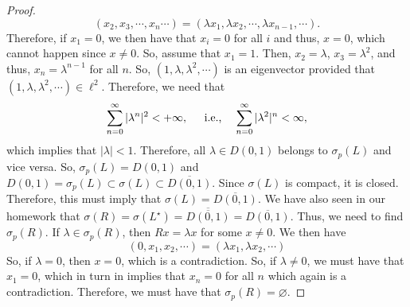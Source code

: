 \documentclass[oneside]{book}
\newcommand{\sumo}{\sum\limits_{n = 0}^{\infty}}
\newcommand{\ov}{\overline}
\newcommand{\sbs}{\subset}
\begin{document}
\begin{proof}
\[ (x_2, x_3, \cdots, x_n \cdots) = (\lambda x_1, \lambda x_2, \cdots, \lambda x_{n -1}, \cdots ).\]
Therefore, if $x_1 = 0$, we then have that $x_i = 0$ for all $i$ and thus, $x = 0$, which cannot happen since $x \neq 0$. So, assume that $x_1 = 1$. Then, $x_2 = \lambda$, $x_3= \lambda^2$, and thus, $x_n = \lambda^{n-1}$ for all $n$. So, $(1, \lambda, \lambda^2, \cdots)$ is an eigenvector provided that $(1, \lambda, \lambda^2, \cdots) \in \ell^2$. Therefore, we need that 
\[ \sumo |\lambda^n|^2 < + \infty, \hspace{4mm} \text{ i.e.,} \hspace{4mm} \sumo |\lambda^2|^n < \infty,\]
which implies that $|\lambda |< 1$. Therefore, all $\lambda \in D(0, 1)$ belongs to $\sigma_p(L)$ and vice versa. So, $\sigma_p(L) = D(0,1)$ and $D(0, 1) = \sigma_p(L) \sbs \sigma(L) \sbs \ov{D(0, 1)}$. Since $\sigma(L)$ is compact, it is closed. Therefore, this must imply that $\sigma(L) = \ov{D(0, 1)}$. We have also seen in our homework that $\sigma(R) = \sigma(L^{\star}) = \ov{\ov{D(0, 1)}} = \ov{D(0,1)}$. Thus, we need to find $\sigma_p(R)$. If $\lambda \in \sigma_p(R)$, then $Rx = \lambda x$ for some $x \neq 0$. We then have 
\[ (0, x_1, x_2, \cdots) = (\lambda x_1, \lambda x_2, \cdots)\]
So, if $\lambda = 0$, then $x = 0$, which is a contradiction. So, if $\lambda \neq 0$, we must have that $x_1 = 0$, which in turn in implies that $x_n = 0$ for all $n$ which again is a contradiction. Therefore, we must have that $\sigma_p(R) = \varnothing$.

\end{proof}
\end{document}
